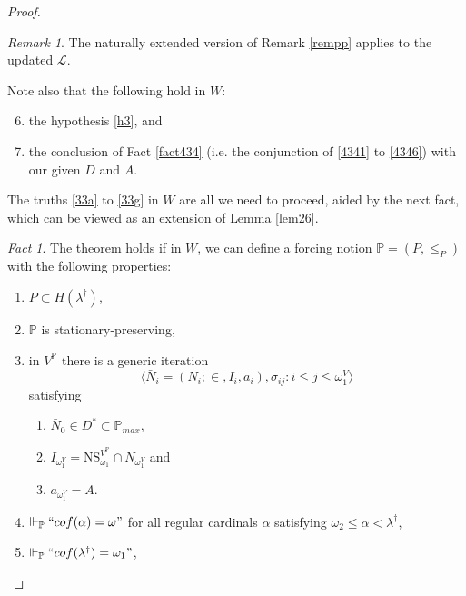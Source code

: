 \documentclass[12pt, twoside]{memoir}
\numberwithin{equation}{section}
\theoremstyle{definition}
\theoremstyle{remark}
\newtheorem{rem}[thm]{Remark}
\newtheorem{fact}[thm]{Fact}
\theoremstyle{definition}
\theoremstyle{definition}
\theoremstyle{definition}
\theoremstyle{remark}
\begin{document}
\begin{proof}
\begin{rem}\label{rempp2}
The naturally extended version of Remark \ref{rempp} applies to the updated $\mathcal{L}$.
\end{rem}

Note also that the following hold in $W$:
\begin{enumerate}[label=(\Alph*)]
    \setcounter{enumi}{5}
    \item the hypothesis \ref{h3}, and
    \item\label{33g} the conclusion of Fact \ref{fact434} (i.e. the conjunction of \ref{4341} to \ref{4346}) with our given $D$ and $A$. 
\end{enumerate}

The truths \ref{33a} to \ref{33g} in $W$ are all we need to proceed, aided by the next fact, which can be viewed as an extension of Lemma \ref{lem26}.

\begin{fact}\label{fact436}
The theorem holds if in $W$, we can define a forcing notion $\mathbb{P} = (P, \leq_P)$ with the following properties: 
\begin{enumerate}[label=(K\arabic*), leftmargin=40pt]
    \item\label{K1} $P \subset H(\lambda^{\dagger})$,
    \item\label{K2} $\mathbb{P}$ is stationary-preserving, 
    \item\label{K3} in $V^{\mathbb{P}}$ there is a generic iteration $$\langle \bar{N}_i = (N_i; \in, I_i, a_i), \sigma_{ij} : i \leq j \leq \omega_1^V \rangle$$ satisfying 
    \begin{enumerate}[label=(\arabic*), leftmargin=40pt]
        \item\label{k31} $\bar{N}_0 \in D^* \subset \mathbb{P}_{max}$,
        \item\label{k32} $I_{\omega_1^V} = \mathrm{NS}_{\omega_1}^{V^{\mathbb{P}}} \cap N_{\omega_1^V}$ and
        \item\label{k33} $a_{\omega_1^V} = A$.
    \end{enumerate} 
    \item\label{K4} $\Vdash_{\mathbb{P}} ``cof(\alpha) = \omega"$ for all regular cardinals $\alpha$ satisfying $\omega_2 \leq \alpha < \lambda^{\dagger}$,
    \item\label{K5} $\Vdash_{\mathbb{P}} ``cof(\lambda^{\dagger}) = \omega_1"$,
\end{enumerate}
\end{fact}


\end{proof}
\end{document}
